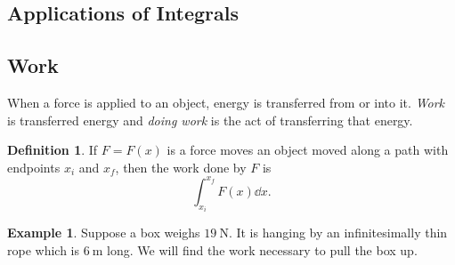 \documentclass[12pt]{article}
\theoremstyle{plain}
\theoremstyle{definition}
\newtheorem*{Def}{Definition}       %
\newtheorem{Ex}[Th]{Example}           %
\theoremstyle{remark}
\newcommand{\te}{\theta}                %
\renewcommand{\:}{\colon}           %
\newcommand{\un}[1]{\underline{#1}}
\renewcommand{\.}{\Cdot}                %
\begin{document}
\begin{multicols}{2}
\section*{Applications of Integrals}

\subsection*{Work}

When a force is applied to an object, energy is transferred from or into it. \emph{Work} is transferred energy and \emph{doing work} is the act of transferring that energy.
\iffalse
\par
Recall that work was defined by the formula \un{$W=F\.d\.\cos(\te)$}
where $\te$ was the angle between the force and the displacement.\par 
The force might now be \emph{variable} across the displacement so we will extend this definition.
\fi
\begin{Def}
  If $F=F(x)$ is a force moves an object moved along a path with endpoints $x_i$ and $x_f$, then the work done by $F$ is 
  $$\int_{x_i}^{x_f}F(x)\dd x.$$
\end{Def}
\vspace*{-0.5em}
\begin{Ex}
Suppose a box weighs $19\ \si{\newton}$. It is hanging by an infinitesimally thin rope which is $6\ \si{\metre}$ long. We will find the work necessary to pull the box up.
\vspace*{-0.5em}
\begin{center}

\begin{tikzpicture}[x=0.75pt,y=0.75pt,yscale=-1,xscale=1]


\end{tikzpicture}
\end{center}
\end{Ex}
\end{multicols}
\end{document}
